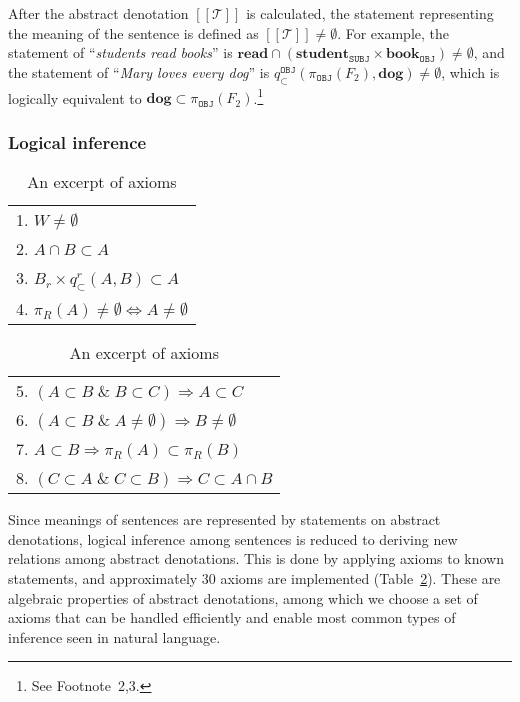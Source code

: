 \documentclass[11pt]{article}
\def\den#1{[\![#1]\!]}
\begin{document}
After the abstract denotation $\den{\mathcal{T}}$ is calculated, 
the statement representing the meaning of the sentence is defined as 
$\den{\mathcal{T}}\ne\emptyset$. For example, the statement of ``\textit{students read books}'' 
is $\textbf{read}\cap(\textbf{student}_{\texttt{SUBJ}}\times 
\textbf{book}_{\texttt{OBJ}})\ne\emptyset$, and 
the statement of ``\textit{Mary loves every dog}'' 
is $q_{\subset}^{\texttt{OBJ}}(\pi_{\texttt{OBJ}}(F_2), \textbf{dog})\ne\emptyset$, 
which is logically equivalent to $\textbf{dog}\subset\pi_{\texttt{OBJ}}(F_2)$.\footnote{See 
Footnote~2,3.}

\subsubsection{Logical inference}

\begin{table}[t]
\centering
\scriptsize
\begin{tabular}{@{}l@{}}
\hline
1. $W\neq\emptyset$ \\
2. $A\cap B\subset A$ \\
3. $B_r\times q^r_{\subset}(A, B)\subset A$ \\
4. $\pi_R(A)\neq\emptyset\Leftrightarrow A\neq\emptyset$ \\
\hline
\end{tabular}
\hspace{0.3em}
\begin{tabular}{@{}l@{}}
\hline
5. $(A\subset B \;\&\; B\subset C)\Rightarrow A\subset C$ \\
6. $(A\subset B \;\&\; A\neq\emptyset)\Rightarrow B\neq\emptyset$ \\
7. $A\subset B\Rightarrow \pi_R(A)\subset \pi_R(B)$ \\
8. $(C\subset A \;\&\; C\subset B)\Rightarrow C\subset A\cap B$ \\
\hline
\end{tabular}
\caption{An excerpt of axioms}
\label{tab:axioms}
\end{table}

Since meanings of sentences are represented by 
statements on abstract denotations, logical inference 
among sentences is reduced to deriving new relations among 
abstract denotations. This is done by applying axioms to known statements, and approximately 
30 axioms are implemented (Table~\ref{tab:axioms}). 
These are algebraic properties of abstract denotations, 
among which we choose a set of axioms that can be handled efficiently and enable 
most common types of inference seen in natural language. 
\end{document}
